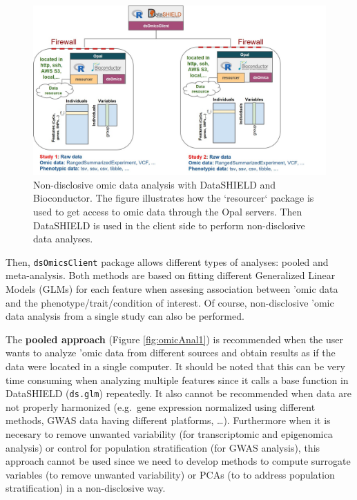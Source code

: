 \documentclass[
]{book}
\begin{document}
\begin{figure}

{\centering \includegraphics[width=20.67in]{fig/dsOmics_A} 

}

\caption{Non-disclosive omic data analysis with DataSHIELD and Bioconductor. The figure illustrates how the `resourcer` package is used to get access to omic data through the Opal servers. Then DataSHIELD is used in the client side to perform non-disclosive data analyses.}\label{fig:opalOmic}
\end{figure}

Then, \texttt{dsOmicsClient} package allows different types of analyses: pooled and meta-analysis. Both methods are based on fitting different Generalized Linear Models (GLMs) for each feature when assesing association between 'omic data and the phenotype/trait/condition of interest. Of course, non-disclosive 'omic data analysis from a single study can also be performed.

The \textbf{pooled approach} (Figure \ref{fig:omicAnal1}) is recommended when the user wants to analyze 'omic data from different sources and obtain results as if the data were located in a single computer. It should be noted that this can be very time consuming when analyzing multiple features since it calls a base function in DataSHIELD (\texttt{ds.glm}) repeatedly. It also cannot be recommended when data are not properly harmonized (e.g.~gene expression normalized using different methods, GWAS data having different platforms, \ldots). Furthermore when it is necesary to remove unwanted variability (for transcriptomic and epigenomica analysis) or control for population stratification (for GWAS analysis), this approach cannot be used since we need to develop methods to compute surrogate variables (to remove unwanted variability) or PCAs (to to address population stratification) in a non-disclosive way.
\end{document}
